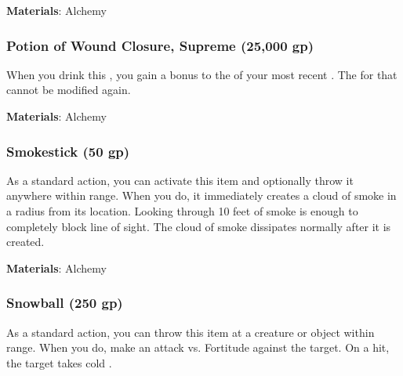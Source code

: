 \vspace{0.25em}
\textbf{Materials}: Alchemy


\lowercase{\hypertarget{item:Potion of Wound Closure, Supreme}{}}\label{item:Potion of Wound Closure, Supreme}
\hypertarget{item:Potion of Wound Closure, Supreme}{\subsubsection{Potion of Wound Closure, Supreme\hfill{} (25,000 gp)}}

When you drink this , you gain a  bonus to the  of your most recent .
The  for that  cannot be modified again.



\vspace{0.25em}
\textbf{Materials}: Alchemy


\lowercase{\hypertarget{item:Smokestick}{}}\label{item:Smokestick}
\hypertarget{item:Smokestick}{\subsubsection{Smokestick\hfill{} (50 gp)}}

As a standard action, you can activate this item and optionally throw it anywhere within \rngclose range.
When you do, it immediately creates a cloud of smoke in a \areasmall radius from its location.
Looking through 10 feet of smoke is enough to completely block line of sight.
The cloud of smoke dissipates normally after it is created.



\vspace{0.25em}
\textbf{Materials}: Alchemy


\lowercase{\hypertarget{item:Snowball}{}}\label{item:Snowball}
\hypertarget{item:Snowball}{\subsubsection{Snowball\hfill{} (250 gp)}}

As a standard action, you can throw this item at a creature or object within \rngclose range.
When you do, make an attack vs. Fortitude against the target.
On a hit, the target takes cold .



